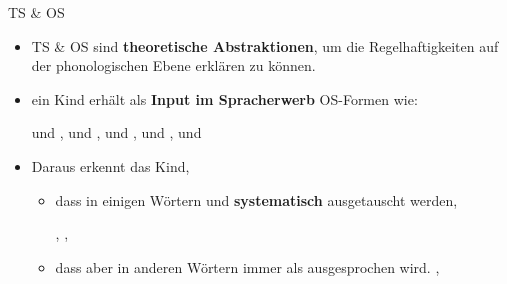 \begin{frame}{TS \& OS}

\begin{itemize}
	\item TS \& OS sind \textbf{theoretische Abstraktionen},
              um die Regelhaftigkeiten auf der phonologischen Ebene erklären zu können.

\pause 

	\item ein Kind erhält als \textbf{Input im Spracherwerb} OS-Formen wie: 
	
	\ea \textipa{[\textscr a:t]} und \textipa{[\textscr E:t@]}, \textipa{[\textscr a:t]} und \textipa{[\textscr E:d5]}, \textipa{[bEt]} und \textipa{[bEt@n]}, \textipa{[ba:t]} und \textipa{[bE:d5]}, \textipa{[kInt]} und \textipa{[kInd5]}
	\z 

\pause 

	\item Daraus erkennt das Kind,

	\begin{itemize}
		\item dass in einigen Wörtern \textipa{[d]} und \textipa{[t]} \textbf{systematisch} ausgetauscht werden,
		
		\ea  {}, , 
		\z 
		
		\item dass aber in anderen Wörtern \textipa{[t]} immer als \textipa{[t]} ausgesprochen wird.  
		\ea {}, 
		\z 
	\end{itemize}
		
\end{itemize}

\end{frame}


